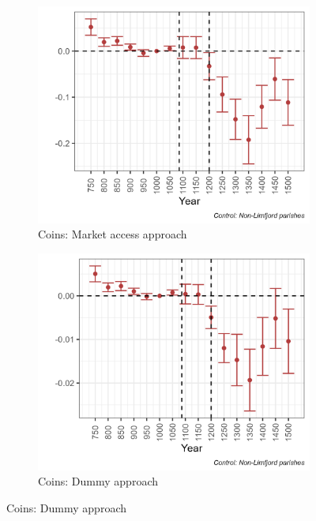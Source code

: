 \documentclass[11pt]{article}
\begin{document}
\begin{figure}[h!]
    \centering
    \caption{Archaelogical results}
    \begin{subfigure}[b]{0.45\textwidth}
        \centering
        \caption{\label{fig:arch1a} Coins: Market access approach}
        \includegraphics[width=\textwidth]{Plots/Regression_plots/arch_MA_coins.png}
    \end{subfigure}
    \hfill
    \begin{subfigure}[b]{0.45\textwidth}
        \centering
        \caption{\label{fig:arch1b} Coins: Dummy approach}
        \includegraphics[width=\textwidth]{Plots/Regression_plots/arch_dummy_coins.png}

\end{subfigure}
\end{figure}
\end{document}
